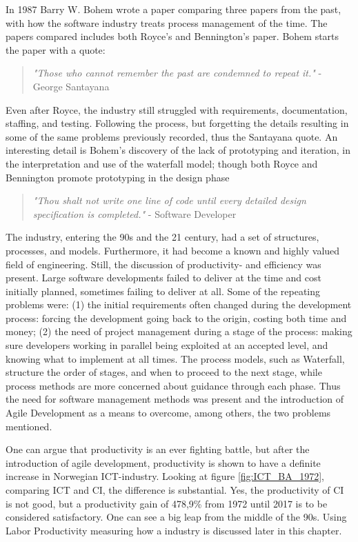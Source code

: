 In 1987 Barry W. Bohem wrote a paper comparing three papers from the past, with how the software industry treats process management of the time. The papers compared includes both Royce's and Bennington's paper. Bohem starts the paper with a quote: 
\begin{quote}
    \textit{"Those who cannot remember the past are condemned to repeat it."} - George Santayana
\end{quote}
Even after Royce, the industry still struggled with requirements, documentation, staffing, and testing. Following the process, but forgetting the details resulting in some of the same problems previously recorded, thus the Santayana quote. An interesting detail is Bohem's discovery of the lack of prototyping and iteration, in the interpretation and use of the waterfall model; though both Royce and Bennington promote prototyping in the design phase 
\begin{quote}
    \textit{"Thou shalt not write one line of code until every detailed design specification is completed."} - Software Developer 
\end{quote}
The industry, entering the 90s and the 21 century, had a set of structures, processes, and models. Furthermore, it had become a known and highly valued field of engineering. Still, the discussion of productivity- and efficiency was present. Large software developments failed to deliver at the time and cost initially planned, sometimes failing to deliver at all.  Some of the repeating problems were: (1) the initial requirements often changed during the development process: forcing the development going back to the origin, costing both time and money; (2) the need of project management during a stage of the process: making sure developers working in parallel being exploited at an accepted level, and knowing what to implement at all times. The process models, such as Waterfall, structure the order of stages, and when to proceed to the next stage, while process methods are more concerned about guidance through each phase. Thus the need for software management methods was present and the introduction of Agile Development as a means to overcome, among others, the two problems mentioned. 

One can argue that productivity is an ever fighting battle, but after the introduction of agile development, productivity is shown to have a definite increase in Norwegian ICT-industry. Looking at figure \ref{fig:ICT_BA_1972}, comparing ICT and CI, the difference is substantial. Yes, the productivity of CI is not good, but a productivity gain of 478,9\% from 1972 until 2017 is to be considered satisfactory. One can see a big leap from the middle of the 90s. Using Labor Productivity measuring how a industry is discussed later in this chapter.

